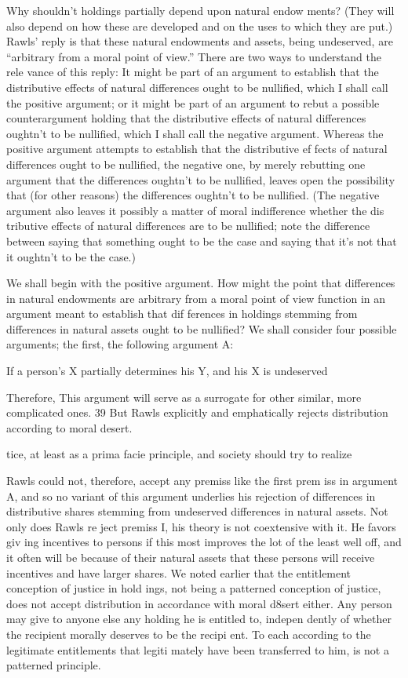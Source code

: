 \documentclass[11pt,openany]{book}
\begin{document}
Why shouldn't holdings partially depend upon natural endow ments? (They will also depend on how these are developed and on the uses to which they are put.) Rawls' reply is that these natural endowments and assets, being undeserved, are ``arbitrary from a moral point of view.'' There are two ways to understand the rele vance of this reply: It might be part of an argument to establish that the distributive effects of natural differences ought to be nullified, which I shall call the positive argument; or it might be part of an argument to rebut a possible counterargument holding that the distributive effects of natural differences oughtn't to be nullified, which I shall call the negative argument. Whereas the positive argument attempts to establish that the distributive ef fects of natural differences ought to be nullified, the negative one, by merely rebutting one argument that the differences oughtn't to be nullified, leaves open the possibility that (for other reasons) the differences oughtn't to be nullified. (The negative argument also leaves it possibly a matter of moral indifference whether the dis tributive effects of natural differences are to be nullified; note the difference between saying that something ought to be the case and saying that it's not that it oughtn't to be the case.) 

We shall begin with the positive argument. How might the point that differences in natural endowments are arbitrary from a moral point of view function in an argument meant to establish that dif ferences in holdings stemming from differences in natural assets ought to be nullified? We shall consider four possible arguments; the first, the following argument A: 

If a person's X partially determines his Y, and his X is undeserved 

Therefore, This argument will serve as a surrogate for other similar, more complicated ones. 39 But Rawls explicitly and emphatically rejects distribution according to moral desert. 

tice, at least as a prima facie principle, and society should try to realize 

Rawls could not, therefore, accept any premiss like the first prem iss in argument A, and so no variant of this argument underlies his rejection of differences in distributive shares stemming from undeserved differences in natural assets. Not only does Rawls re ject premiss I, his theory is not coextensive with it. He favors giv ing incentives to persons if this most improves the lot of the least well off, and it often will be because of their natural assets that these persons will receive incentives and have larger shares. We noted earlier that the entitlement conception of justice in hold ings, not being a patterned conception of justice, does not accept distribution in accordance with moral d8sert either. Any person may give to anyone else any holding he is entitled to, indepen dently of whether the recipient morally deserves to be the recipi ent. To each according to the legitimate entitlements that legiti mately have been transferred to him, is not a patterned principle. 
\end{document}
